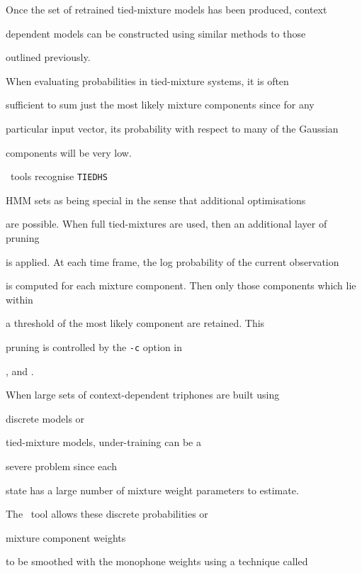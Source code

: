 Once the set of retrained tied-mixture models has been produced, context


dependent models can be constructed using similar methods to those


outlined previously.





When evaluating probabilities in tied-mixture systems, it is often


sufficient to sum just the most likely mixture components since for any


particular input vector, its probability with respect to many of the Gaussian


components will be very low.


\HTK\ tools recognise \texttt{TIEDHS}


HMM sets as being special in the sense that additional optimisations


are possible. When full tied-mixtures are used, then an additional layer of pruning


is applied.  At each time frame, the log probability of the current observation


is computed for each mixture component.  Then only those components which lie within


a threshold of the most likely component are retained.  This 


pruning is controlled by the \texttt{-c} option in 


,  and .










When large sets of context-dependent triphones are built using


discrete models or


tied-mixture models, under-training can be a 


severe problem since each 


state has a large number of mixture weight parameters to estimate.


The \HTK\ tool  allows these discrete probabilities or


mixture component weights


to be smoothed with the monophone weights using a technique called 


